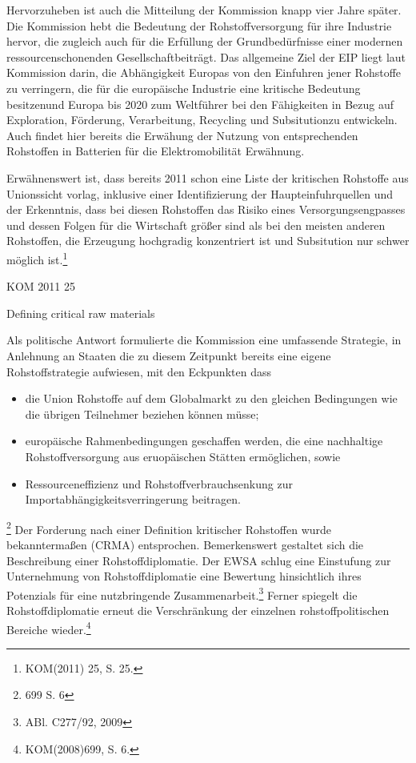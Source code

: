 \documentclass[12pt,a4paper,oneside]{book} %
\begin{document}
Hervorzuheben ist auch die Mitteilung der Kommission knapp vier Jahre später. Die Kommission hebt die Bedeutung der Rohstoffversorgung für ihre Industrie hervor, die zugleich auch für die Erfüllung der \glqq Grundbedürfnisse einer modernen ressourcenschonenden Gesellschaft\grqq beiträgt. Das allgemeine Ziel der EIP liegt laut Kommission darin, die \glqq Abhängigkeit Europas von den Einfuhren jener Rohstoffe zu verringern, die für die europäische Industrie eine kritische Bedeutung besitzen\grqq und Europa \glqq bis 2020 zum Weltführer bei den Fähigkeiten in Bezug auf Exploration, Förderung, Verarbeitung, Recycling und Subsitution\grqq zu entwickeln.\autocite{S. 5} Auch findet hier bereits die Erwähung der Nutzung von entsprechenden Rohstoffen in Batterien für die Elektromobilität Erwähnung.\autocite{S. 1.}

Erwähnenswert ist, dass bereits 2011 schon eine Liste der kritischen Rohstoffe aus Unionssicht vorlag, inklusive einer Identifizierung der Haupteinfuhrquellen und der Erkenntnis, dass bei diesen Rohstoffen \glqq das Risiko eines Versorgungsengpasses und dessen Folgen für die Wirtschaft größer sind als bei den meisten anderen Rohstoffen\grqq, die Erzeugung hochgradig konzentriert ist und Subsitution nur schwer möglich ist.\footnote{KOM(2011) 25, S. 25.}



KOM 2011 25

Defining critical raw materials



Als politische Antwort formulierte die Kommission eine \glqq umfassende Strategie\grqq, in Anlehnung an Staaten die zu diesem Zeitpunkt bereits eine eigene Rohstoffstrategie aufwiesen, mit den Eckpunkten dass
\begin{itemize}
	\item die Union Rohstoffe auf dem Globalmarkt zu den gleichen Bedingungen wie die übrigen Teilnehmer beziehen können müsse;
	\item europäische Rahmenbedingungen geschaffen werden, die eine nachhaltige Rohstoffversorgung aus eruopäischen Stätten ermöglichen, sowie
	\item Ressourceneffizienz und Rohstoffverbrauchsenkung zur Importabhängigkeitsverringerung 
	beitragen.
\end{itemize}
\footnote{699 S. 6}
Der Forderung nach einer Definition kritischer Rohstoffen wurde bekanntermaßen (CRMA) entsprochen. Bemerkenswert gestaltet sich die Beschreibung einer \glqq Rohstoffdiplomatie\grqq. Der EWSA schlug eine Einstufung zur Unternehmung von Rohstoffdiplomatie eine Bewertung hinsichtlich ihres Potenzials für \glqq eine nutzbringende Zusammenarbeit\glqq.\footnote{ABl. C277/92, 2009} Ferner spiegelt die Rohstoffdiplomatie erneut die Verschränkung der einzelnen rohstoffpolitischen Bereiche wieder.\footnote{KOM(2008)699, S. 6.} 
\end{document}
